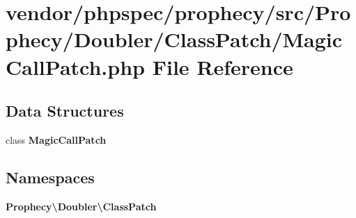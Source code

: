 \section{vendor/phpspec/prophecy/src/\+Prophecy/\+Doubler/\+Class\+Patch/\+Magic\+Call\+Patch.php File Reference}
\label{_magic_call_patch_8php}
\subsection*{Data Structures}
\begin{DoxyCompactItemize}
\item 
class {\bf Magic\+Call\+Patch}
\end{DoxyCompactItemize}
\subsection*{Namespaces}
\begin{DoxyCompactItemize}
\item 
 {\bf Prophecy\textbackslash{}\+Doubler\textbackslash{}\+Class\+Patch}
\end{DoxyCompactItemize}
